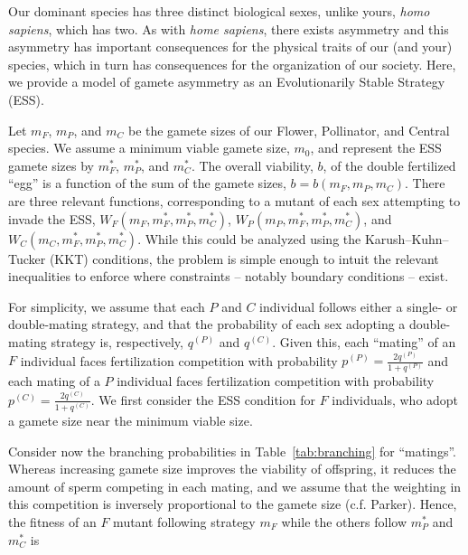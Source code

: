 

Our dominant species has three distinct biological sexes, unlike yours, \emph{homo sapiens}, which has two. As with \emph{home sapiens}, there exists asymmetry and this asymmetry has important consequences for the physical traits of our (and your) species, which in turn has consequences for the organization of our society. Here, we provide a model of gamete asymmetry as an Evolutionarily Stable Strategy (ESS).

Let $m_F$, $m_P$, and $m_C$ be the gamete sizes of our Flower, Pollinator, and Central species. We assume a minimum viable gamete size, $m_0$, and represent the ESS gamete sizes by  $m^*_F$, $m^*_P$, and $m^*_C$. The overall viability, $b$, of the double fertilized ``egg'' is a function of the sum of the gamete sizes, $b=b(m_F,m_P,m_C)$. There are three relevant functions, corresponding to a mutant of each sex attempting to invade the ESS, $W_F(m_F,m_F^*,m_P^*,m_C^*)$, $W_P(m_P,m_F^*,m_P^*,m_C^*)$, and $W_C(m_C,m_F^*,m_P^*,m_C^*)$. While this could be analyzed using the Karush–Kuhn–Tucker (KKT) conditions, the problem is simple enough to intuit the relevant inequalities to enforce where constraints -- notably boundary conditions -- exist.

For simplicity, we assume that each $P$ and $C$ individual follows either a single- or double-mating strategy, and that the probability of each sex adopting a double-mating strategy is, respectively, $q^{(P)}$ and $q^{(C)}$. Given this, each ``mating'' of an $F$ individual faces fertilization competition with probability $p^{(P)} = \frac{2 q^{(P)}}{1+q^{(P)}}$ and each mating of a $P$ individual faces fertilization competition with probability $p^{(C)} = \frac{2 q^{(C)}}{1+q^{(C)}}$. We first consider the ESS condition for $F$ individuals, who adopt a gamete size near the minimum viable size.

Consider now the branching probabilities in Table~\ref{tab:branching} for ``matings''. Whereas increasing gamete size improves the viability of offspring, it reduces the amount of sperm competing in each mating, and we assume that the weighting in this competition is inversely proportional to the gamete size (c.f. Parker). Hence, the fitness of an $F$ mutant following strategy $m_F$ while the others follow $m_P^*$ and $m_C^*$ is

